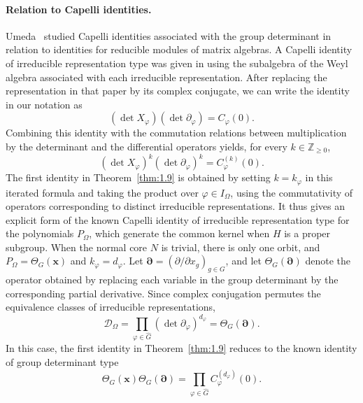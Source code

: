 \documentclass[12pt,a4paper]{article}
\theoremstyle{definition}
\numberwithin{definition}{section}
\begin{document}
\paragraph{Relation to Capelli identities.}
Umeda~\cite{MR3837932} studied Capelli identities associated with the group
determinant in relation to identities for reducible modules of matrix algebras.
A Capelli identity of irreducible representation type was given in
\cite[Section~3, Theorem~10]{MR3841213} using the subalgebra of the Weyl
algebra associated with each irreducible representation.
After replacing the representation in that paper by its complex conjugate,
we can write the identity in our notation as
\[
(\det X_\varphi)(\det\partial_\varphi)=C_\varphi(0).
\]
Combining this identity with the commutation relations between multiplication
by the determinant and the differential operators yields, for every
$k\in\mathbb Z_{\ge0}$,
\[
(\det X_\varphi)^k(\det\partial_\varphi)^k
=C_\varphi^{(k)}(0).
\]
The first identity in Theorem~\ref{thm:1.9} is obtained by setting
$k=k_\varphi$ in this iterated formula and taking the product over
$\varphi\in I_\Omega$, using the commutativity of operators corresponding
to distinct irreducible representations.
It thus gives an explicit form of the known Capelli identity of irreducible
representation type for the polynomials $P_\Omega$, which generate the
common kernel when $H$ is a proper subgroup.
When the normal core $N$ is trivial, there is only one orbit, and
$P_\Omega=\Theta_G(\bm x)$ and $k_\varphi=d_\varphi$.
Let $\bm\partial=(\partial/\partial x_g)_{g\in G}$, and let
$\Theta_G(\bm\partial)$ denote the operator obtained by replacing each
variable in the group determinant by the corresponding partial derivative.
Since complex conjugation permutes the equivalence classes of irreducible
representations,
\[
\mathcal D_\Omega
=\prod_{\varphi\in\widehat G}(\det\partial_\varphi)^{d_\varphi}
=\Theta_G(\bm\partial).
\]
In this case, the first identity in Theorem~\ref{thm:1.9} reduces to the
known identity of group determinant type
\[
\Theta_G(\bm x)\Theta_G(\bm\partial)
=\prod_{\varphi\in\widehat G}C_\varphi^{(d_\varphi)}(0).
\]
\end{document}
